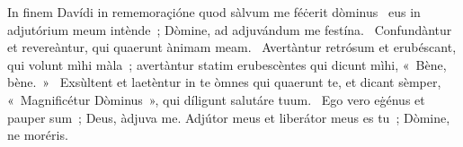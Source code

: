 { In finem Davídi in rememoraçióne quod sàlvum me féċerit dòminus}
{%
~eus in adjutórium meum intènde~; Dòmine, ad adjuvándum me festína. 
~Confundàntur et revereàntur, qui quaerunt ànimam meam. 
~Avertàntur retrósum et erubéscant, qui volunt mìhi màla~; avertàntur statim erubescèntes qui dicunt mìhi, «~Bène, bène.~» 
~Exsùltent et laetèntur in te òmnes qui quaerunt te, et dicant sèmper, «~Magnificétur Dòminus~», qui díligunt salutáre tuum. 
~Ego vero eġénus et pauper sum~; Deus, àdjuva me. Adjútor meus et liberátor meus es tu~; Dòmine, ne moréris. 
}
